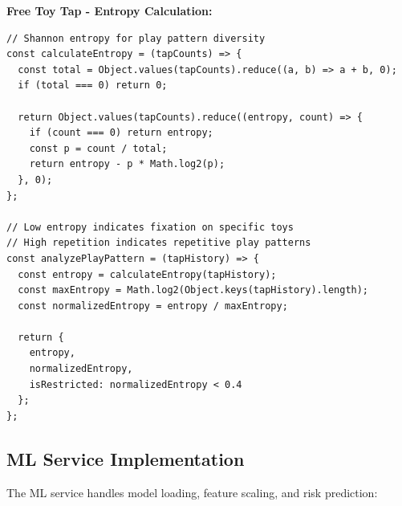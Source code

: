 \documentclass[12pt,letterpaper]{article}
\begin{document}
\textbf{Free Toy Tap - Entropy Calculation:}

\begin{verbatim}
// Shannon entropy for play pattern diversity
const calculateEntropy = (tapCounts) => {
  const total = Object.values(tapCounts).reduce((a, b) => a + b, 0);
  if (total === 0) return 0;
  
  return Object.values(tapCounts).reduce((entropy, count) => {
    if (count === 0) return entropy;
    const p = count / total;
    return entropy - p * Math.log2(p);
  }, 0);
};

// Low entropy indicates fixation on specific toys
// High repetition indicates repetitive play patterns
const analyzePlayPattern = (tapHistory) => {
  const entropy = calculateEntropy(tapHistory);
  const maxEntropy = Math.log2(Object.keys(tapHistory).length);
  const normalizedEntropy = entropy / maxEntropy;
  
  return {
    entropy,
    normalizedEntropy,
    isRestricted: normalizedEntropy < 0.4
  };
};
\end{verbatim}

\subsection{ML Service Implementation}

The ML service handles model loading, feature scaling, and risk prediction:
\end{document}
